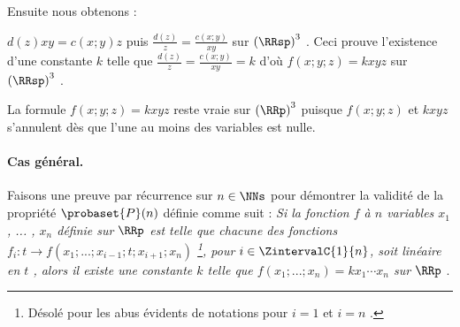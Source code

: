 \medskip

Ensuite nous obtenons :

\smallskip

$d(z) x y = c(x ; y) z$ puis $\frac{d(z)}{z} = \frac{c(x ; y)}{xy}$ sur $\left( \RRsp \right)^3$ . Ceci prouve l'existence d'une constante $k$ telle que $\frac{d(z)}{z} = \frac{c(x ; y)}{xy} = k$ d'où $f(x ; y ; z) = k x y z$ sur $\left( \RRsp \right)^3$ .


\medskip

La formule $f(x ; y ; z) = k x y z$ reste vraie sur $\left( \RRp \right)^3$ puisque $f(x ; y ; z)$ et $k x y z$ s'annulent dès que l'une au moins des variables est nulle.



\paragraph{Cas général.}

Faisons une preuve par récurrence sur $n \in \NNs$ pour démontrer la validité de la propriété $\probaset{P}(n)$ définie comme suit :
\emph{\og Si la fonction $f$ à $n$ variables $x_1$ , ... , $x_n$ définie sur $\RRp$ est telle que chacune des fonctions $f_i : t \rightarrow f(x_1 ; ... ; x_{i-1} ; t ; x_{i+1} ; x_n)$
\footnote{
	Désolé pour les abus évidents de notations pour $i = 1$ et $i = n$ . 
},
pour $i \in \ZintervalC{1}{n}$, soit linéaire en $t$ , alors il existe une constante $k$ telle que $f(x_1 ; ... ; x_n) = k x_1 \cdots x_n$ sur $\RRp$ \fg}.

